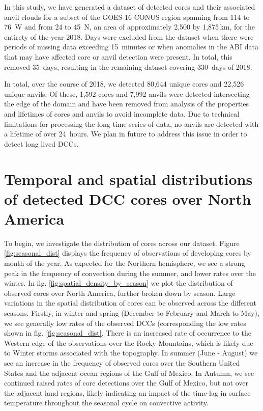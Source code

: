 In this study, we have generated a dataset of detected cores and their associated anvil clouds for a subset of the GOES-16 CONUS region spanning from 114 to 76\textdegree~W and from 24 to 45\textdegree~N, an area of approximately 2,500 by 1,875\,\unit{km}, for the entirety of the year 2018.
Days were excluded from the dataset when there were periods of missing data exceeding 15~minutes or when anomalies in the ABI data that may have affected core or anvil detection were present.
In total, this removed 35~days, resulting in the remaining dataset covering 330~days of 2018.

In total, over the course of 2018, we detected 80,644 unique cores and 22,526 unique anvils.
Of these, 1,592 cores and 7,992 anvils were detected intersecting the edge of the domain and have been removed from analysis of the properties and lifetimes of cores and anvils to avoid incomplete data.
Due to technical limitations for processing the long time series of data, no anvils are detected with a lifetime of over 24~hours.
We plan in future to address this issue in order to detect long lived DCCs.


\section{Temporal and spatial distributions of detected DCC cores over North America}


To begin, we investigate the distribution of cores across our dataset.
Figure \ref{fig:seasonal_dist} displays the frequency of observations of developing cores by month of the year.
As expected for the Northern hemisphere, we see a strong peak in the frequency of convection during the summer, and lower rates over the winter.
In fig. \ref{fig:spatial_density_by_season} we plot the distribution of observed cores over North America, further broken down by season.
Large variations in the spatial distribution of cores can be observed across the different seasons.
Firstly, in winter and spring (December to February and March to May), we see generally low rates of the observed DCCs (corresponding the low rates shown in fig. \ref{fig:seasonal_dist}.
There is an increased rate of occurrence to the Western edge of the observations over the Rocky Mountains, which is likely due to Winter storms associated with the topography.
In summer (June - August) we see an increase in the frequency of observed cores over the Southern United States and the adjacent ocean regions of the Gulf of Mexico.
In Autumn, we see continued raised rates of core detections over the Gulf of Mexico, but not over the adjacent land regions, likely indicating an impact of the time-lag in surface temperature throughout the seasonal cycle on convective activity.

